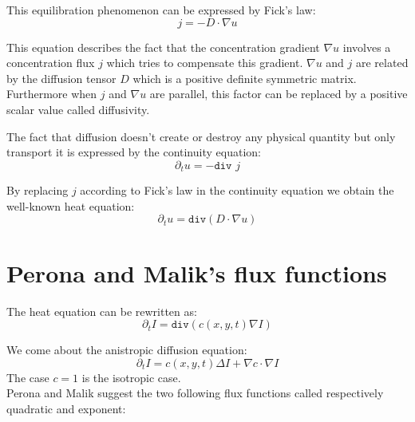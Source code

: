 \documentclass{article}
\begin{document}
This equilibration phenomenon can be expressed by Fick's law: \begin{equation}j = -D\cdot\nabla u\end{equation}

This equation describes the fact that the concentration gradient $\nabla u$ involves a concentration flux $j$ which tries to compensate this gradient. $\nabla u$ and $j$ are related by the diffusion tensor $D$ which is a positive definite symmetric matrix. Furthermore when $j$ and $\nabla u$ are parallel, this factor can be replaced by a positive scalar value called diffusivity. %

The fact that diffusion doesn't create or destroy any physical quantity but only transport it is expressed by the continuity equation: \begin{equation}\partial_t u = -\texttt{div } j\end{equation} %

By replacing $j$ according to Fick's law in the continuity equation we obtain the well-known heat equation: \begin{equation}\partial_t u = \texttt{div} (D\cdot\nabla u)\end{equation} %





\section{Perona and Malik's flux functions}


The heat equation can be rewritten as: \begin{equation}\partial_t I = \texttt{div} (c(x,y,t)\nabla I)\end{equation} %

We come about the anistropic diffusion equation: \begin{equation}\partial_t I = c(x, y, t)\Delta I+\nabla c\cdot\nabla I\end{equation} %
The case $c=1$ is the isotropic case.\\
Perona and Malik suggest the two following flux functions called respectively quadratic and exponent:
\end{document}
